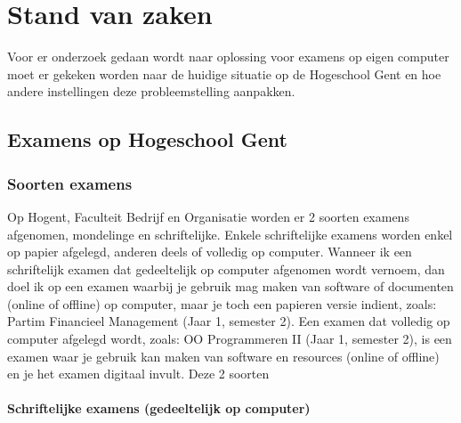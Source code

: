 \chapter{Stand van zaken}
\label{ch:stand-van-zaken}



Voor er onderzoek gedaan wordt naar oplossing voor examens op eigen computer moet er gekeken worden naar de huidige situatie op de Hogeschool Gent en hoe andere instellingen deze probleemstelling aanpakken. 

\section{Examens op Hogeschool Gent}

\subsection{Soorten examens}
Op Hogent, Faculteit Bedrijf en Organisatie worden er 2 soorten examens afgenomen, mondelinge en schriftelijke. Enkele schriftelijke examens worden enkel op papier afgelegd, anderen deels of volledig op computer. Wanneer ik een schriftelijk examen dat gedeeltelijk op computer afgenomen wordt vernoem, dan doel ik op een examen waarbij je gebruik mag maken van software of documenten (online of offline) op computer, maar je toch een papieren versie indient, zoals: Partim Financieel Management (Jaar 1, semester 2). Een examen dat volledig op computer afgelegd wordt, zoals: OO Programmeren II (Jaar 1, semester 2), is een examen waar je gebruik kan maken van software en resources (online of offline) en je het examen digitaal invult. Deze 2 soorten 

\subsubsection{Schriftelijke examens (gedeeltelijk op computer) }

